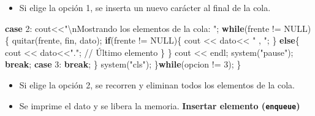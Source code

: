 \documentclass[
  11pt,
  a4paper,
  DIV=11,
  numbers=noendperiod]{scrreprt}
\newenvironment{Shaded}{\begin{snugshade}}{\end{snugshade}}
\newcommand{\CommentTok}[1]{\textcolor[rgb]{0.37,0.37,0.37}{#1}}
\newcommand{\ControlFlowTok}[1]{\textcolor[rgb]{0.00,0.23,0.31}{\textbf{#1}}}
\newcommand{\DecValTok}[1]{\textcolor[rgb]{0.68,0.00,0.00}{#1}}
\newcommand{\NormalTok}[1]{\textcolor[rgb]{0.00,0.23,0.31}{#1}}
\newcommand{\OperatorTok}[1]{\textcolor[rgb]{0.37,0.37,0.37}{#1}}
\newcommand{\SpecialCharTok}[1]{\textcolor[rgb]{0.37,0.37,0.37}{#1}}
\newcommand{\StringTok}[1]{\textcolor[rgb]{0.13,0.47,0.30}{#1}}
\providecommand{\tightlist}{%
  \setlength{\itemsep}{0pt}\setlength{\parskip}{0pt}}
\begin{document}
\begin{itemize}
\tightlist
\item
  Si elige la opción 1, se inserta un nuevo carácter al final de la
  cola.
\end{itemize}

\begin{Shaded}
\begin{Highlighting}[]
            \ControlFlowTok{case} \DecValTok{2}\OperatorTok{:}\NormalTok{ cout}\OperatorTok{\textless{}\textless{}}\StringTok{"}\SpecialCharTok{\textbackslash{}n}\StringTok{Mostrando los elementos de la cola: "}\OperatorTok{;}
                    \ControlFlowTok{while}\OperatorTok{(}\NormalTok{frente }\OperatorTok{!=}\NormalTok{ NULL}\OperatorTok{)\{}
\NormalTok{                        quitar}\OperatorTok{(}\NormalTok{frente}\OperatorTok{,}\NormalTok{ fin}\OperatorTok{,}\NormalTok{ dato}\OperatorTok{);}
                        \ControlFlowTok{if}\OperatorTok{(}\NormalTok{frente }\OperatorTok{!=}\NormalTok{ NULL}\OperatorTok{)\{}
\NormalTok{                            cout }\OperatorTok{\textless{}\textless{}}\NormalTok{ dato}\OperatorTok{\textless{}\textless{}} \StringTok{" , "}\OperatorTok{;}
                        \OperatorTok{\}}
                        \ControlFlowTok{else}\OperatorTok{\{}
\NormalTok{                            cout }\OperatorTok{\textless{}\textless{}}\NormalTok{ dato}\OperatorTok{\textless{}\textless{}}\StringTok{"."}\OperatorTok{;} \CommentTok{// Último elemento}
                        \OperatorTok{\}}
                    \OperatorTok{\}}
\NormalTok{                    cout }\OperatorTok{\textless{}\textless{}}\NormalTok{ endl}\OperatorTok{;}
\NormalTok{                    system}\OperatorTok{(}\StringTok{"pause"}\OperatorTok{);}
                    \ControlFlowTok{break}\OperatorTok{;}
            \ControlFlowTok{case} \DecValTok{3}\OperatorTok{:} \ControlFlowTok{break}\OperatorTok{;}
        \OperatorTok{\}}
\NormalTok{        system}\OperatorTok{(}\StringTok{"cls"}\OperatorTok{);}
    \OperatorTok{\}}\ControlFlowTok{while}\OperatorTok{(}\NormalTok{opcion }\OperatorTok{!=} \DecValTok{3}\OperatorTok{);}
\OperatorTok{\}}
\end{Highlighting}
\end{Shaded}

\begin{itemize}
\tightlist
\item
  Si elige la opción 2, se recorren y eliminan todos los elementos de la
  cola.
\item
  Se imprime el dato y se libera la memoria. \textbf{Insertar elemento
  (\texttt{enqueue})}
\end{itemize}
\end{document}
